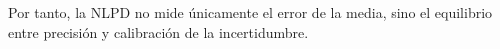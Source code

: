 Por tanto, la NLPD no mide únicamente el error de la media, sino el equilibrio entre
precisión y calibración de la incertidumbre.





